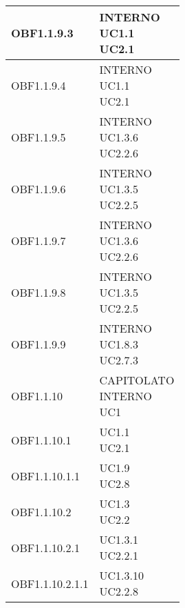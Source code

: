 \documentclass{scalatekids-article}
\begin{document}
\begin{longtable}[H]{|p{5.5cm}|p{5.5cm}|}
\hline
OBF1.1.9.3 & \multiLineCell[t]{INTERNO\\UC1.1\\UC2.1\\}\\
\hline
OBF1.1.9.4 & \multiLineCell[t]{INTERNO\\UC1.1\\UC2.1\\}\\
\hline
OBF1.1.9.5 & \multiLineCell[t]{INTERNO\\UC1.3.6\\UC2.2.6\\}\\
\hline
OBF1.1.9.6 & \multiLineCell[t]{INTERNO\\UC1.3.5\\UC2.2.5\\}\\
\hline
OBF1.1.9.7 & \multiLineCell[t]{INTERNO\\UC1.3.6\\UC2.2.6\\}\\
\hline
OBF1.1.9.8 & \multiLineCell[t]{INTERNO\\UC1.3.5\\UC2.2.5\\}\\
\hline
OBF1.1.9.9 & \multiLineCell[t]{INTERNO\\UC1.8.3\\UC2.7.3\\}\\
\hline
OBF1.1.10 & \multiLineCell[t]{CAPITOLATO\\INTERNO\\UC1\\}\\
\hline
OBF1.1.10.1 & \multiLineCell[t]{UC1.1\\UC2.1\\}\\
\hline
OBF1.1.10.1.1 & \multiLineCell[t]{UC1.9\\UC2.8\\}\\
\hline
OBF1.1.10.2 & \multiLineCell[t]{UC1.3\\UC2.2\\}\\
\hline
OBF1.1.10.2.1 & \multiLineCell[t]{UC1.3.1\\UC2.2.1\\}\\
\hline
OBF1.1.10.2.1.1 & \multiLineCell[t]{UC1.3.10\\UC2.2.8\\}\\

\end{longtable}
\end{document}
